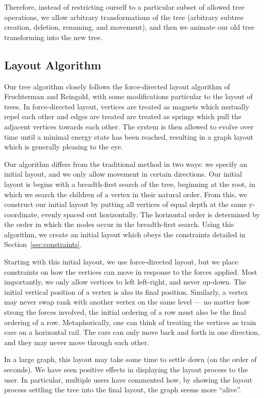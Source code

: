 \documentclass{article}
\begin{document}
Therefore, instead of restricting ourself to a particular subset of allowed
tree operations, we allow arbitrary transformations of the tree (arbitrary subtree creation, deletion, renaming, and movement), and then we
animate our old tree transforming into the new tree.  

\subsection{Layout Algorithm}

Our tree algorithm closely follows the force-directed layout algorithm of Fruchterman and Reingold\cite{fdp}, with some modifications particular to the layout of trees.  In force-directed layout, vertices are treated as magnets which mutually repel each other and edges are treated are treated as springs which pull the adjacent vertices towards each other.  The system is then allowed to evolve over time until a minimal energy state has been reached, resulting in a graph layout which is generally pleasing to the eye\cite{Cohen}.

Our algorithm differs from the traditional method in two ways: we specify an initial layout, and we only allow movement in certain directions.  Our initial layout is begins with a breadth-first search of the tree, beginning at the root, in which we search the children of a vertex in their natural order.  From this, we construct our initial layout by putting all vertices of equal depth at the same y-coordinate, evenly spaced out horizontally.  The horizontal order is determined by the order in which the nodes occur in the breadth-first search.
Using this algorithm, we create an initial layout which obeys the constraints detailed in Section~\ref{sec:constraints}.

Starting with this initial layout, we use force-directed layout, but we place
constraints on how the vertices can move in response to the forces applied.
Most importantly, we only allow vertices to left left-right, and never
up-down.  The initial vertical position of a vertex is also its final
position.  Similarly, a vertex may never swap rank with another vertex on the
same level --- no matter how strong the forces involved, the initial ordering
of a row must also be the final ordering of a row.  Metaphorically, one can
think of treating the vertices as train cars on a horizontal rail.  The cars
can only move back and forth in one direction, and they may never move through
each other.

In a large graph, this layout may take some time to settle down (on the order
of seconds).  We have seen positive effects in displaying the layout process to
the user.  In particular, multiple users have commented how, by showing the
layout process settling the tree into the final layout, the graph seems more
``alive''. 
\end{document}
